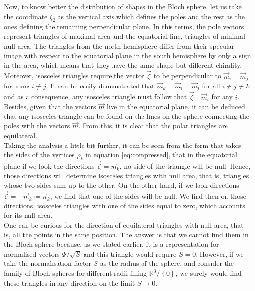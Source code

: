 Now, to know better the distribution of shapes in the Bloch sphere, let us take the coordinate $\zeta_2$ as the vertical axis which defines the poles and the rest as the ones defining the remaining perpendicular plane. In this terms, the pole vectors represent triangles of maximal area and the equatorial line, triangles of minimal null area. The triangles from the north hemisphere differ from their specular image with respect to the equatorial plane in the south hemisphere by only a sign in the area, which means that they have the same shape but different chirality.\\

Moreover, isosceles triangles require the vector $\vec{\zeta}$ to be perpendicular to $\vec{m}_i-\vec{m}_j$ for some $i \neq j$. It can be easily demonstrated that $\vec{m}_k \perp \vec{m}_i-\vec{m}_j$ for all $i \neq j \neq k$ and as a consequence, any isosceles triangle must follow that $\vec{\zeta}\parallel\vec{m}_i$ for any $i$. Besides, given that the vectors $\vec{m}$ live in the equatorial plane, it can be deduced that any isosceles triangle can be found on the lines on the sphere connecting the poles with the vectors $\vec{m}$. From this, it is clear that the polar triangles are equilateral.\\

Taking the analysis a little bit further, it can be seen from the form that takes the sides of the vertices $\rho_k$ in equation \eqref{eq:compressed}, that in the equatorial plane if we look the directions $\vec{\zeta} = \vec{m}_k$, no side of the triangle will be null. Hence, those directions will determine isosceles triangles with null area, that is, triangles whose two sides sum up to the other. On the other hand, if we look directions $\vec{\zeta} = -\vec{m}_k \coloneqq \vec{n}_k$, we find that one of the sides will be null. We find then on those directions, isosceles triangles with one of the sides equal to zero, which accounts for its null area.\\

One can be curious for the direction of equilateral triangles with null area, that is, all the points in the same position.  The answer is that we cannot find them in the Bloch sphere because, as we stated earlier, it is a representation for normalised vectors $\Psi/\sqrt{S}$ and this triangle would require $S=0$. However, if we take the normalisation factor $S$ as the radius of the sphere, and consider the family of Bloch spheres for different radii filling $\mathbb{R}^3/\left\{0\right\}$, we surely would find these triangles in any direction on the limit $S\to 0$.\\

